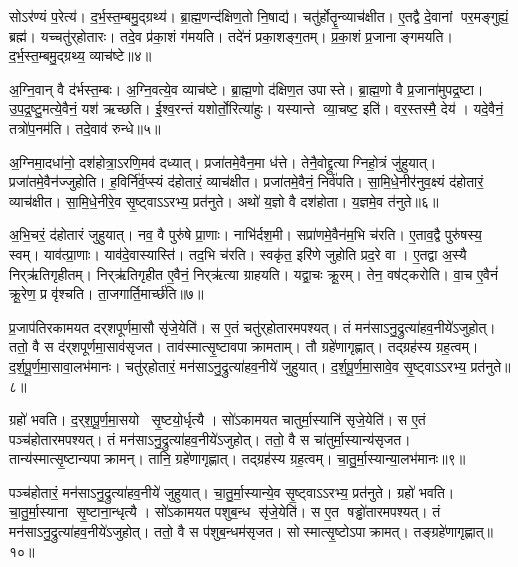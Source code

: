 सोऽर॑ण्यं प॒रेत्य॑।
द॒र्भ॒स्त॒म्बमु॒द्ग्रथ्य॑।
ब्रा॒ह्म॒णन्द॑क्षिण॒तो नि॒षाद्य॑।
चतु॑र्होतॄ॒न्व्याच॑क्षीत।
ए॒तद्वै दे॒वानां पर॒मङ्गुह्यं॒ ब्रह्म॑।
यच्चतु॑र्‌होतारः।
तदे॒व प्र॑का॒शं ग॑मयति।
तदे॑नं प्रका॒शङ्ग॒तम्।
प्र॒का॒शं प्र॒जानाङ्गमयति।
द॒र्भ॒स्त॒म्बमु॒द्ग्रथ्य॒ व्याच॑ष्टे॥४॥

अ॒ग्नि॒वान् वै द॑र्भस्त॒म्बः।
अ॒ग्नि॒वत्ये॒व व्याच॑ष्टे।
ब्रा॒ह्म॒णो द॑क्षिण॒त उपास्ते।
ब्रा॒ह्म॒णो वै प्र॒जाना॑मुपद्र॒ष्टा।
उ॒प॒द्र॒ष्टु॒मत्ये॒वैनं॒ यश॑ ऋच्छति।
ई॒श्व॒रन्तं यशोर्तो॒रित्या॑हुः।
यस्यान्ते व्या॒चष्ट॒ इति॑।
वर॒स्तस्मै॒ देय॑।
यदे॒वैनं॒ तत्रो॑प॒नम॑ति।
तदे॒वाव॑ रुन्धे॥५॥

अ॒ग्निमा॒दधा॑नो॒ दश॑होत्रा॒ऽरणि॒मव॑ दध्यात्।
प्रजा॑तमे॒वैन॒मा ध॑त्ते।
तेनै॒वोद्द्रुत्याग्निहो॒त्रं जु॑हुयात्।
प्रजा॑तमे॒वैन॑ज्जुहोति।
ह॒विर्नि॑र्व॒प्स्यं द॑होतारं॒ व्याच॑क्षीत।
प्रजा॑तमे॒वैनं॒ निर्व॑पति।
सा॒मि॒धे॒नीर॑नुव॒क्ष्यं द॑होतारं॒ व्याच॑क्षीत।
सा॒मि॒धे॒नीरे॒व सृ॒ष्ट्वाऽऽरभ्य॒ प्रत॑नुते।
अथो॑ य॒ज्ञो वै दश॑होता।
य॒ज्ञमे॒व त॑नुते॥६॥

अ॒भि॒चरं॒ द॑होतारं जुहुयात्।
नव॒ वै पुरु॑षे प्रा॒णाः।
नाभि॑र्दश॒मी।
सप्रा॑णमे॒वैन॑म॒भि च॑रति।
ए॒ताव॒द्वै पुरु॑षस्य॒ स्वम्।
याव॑त्प्रा॒णाः।
याव॑दे॒वास्यास्ति॑।
तद॒भि च॑रति।
स्वकृ॑त॒ इरि॑णे जुहोति प्रद॒रे वा।
ए॒तद्वा अ॒स्यै निर्‌ऋ॑तिगृहीतम्।
निर्‌ऋ॑तिगृहीत ए॒वैनं॒ निर्‌ऋ॑त्या ग्राहयति।
यद्वा॒चः क्रू॒रम्।
तेन॒ वष॑ट्करोति।
वा॒च ए॒वैनं॑ क्रू॒रेण॒ प्र वृ॑श्चति।
ता॒जगार्ति॒मार्च्छ॑ति॥७॥\anuvakamend[दश॑होता॒ सृष्ट्या॑ ऋ॒च्छेद्व्याच॑प्टे रुन्ध ए॒व त॑नुते॒ निर्‌ऋ॑तिगृहीतं॒ पञ्च॑ च]

प्र॒जाप॑तिरकामयत दर्‌शपूर्णमा॒सौ सृ॑जे॒येति॑।
स ए॒तं  चतु॑र्‌होतारमपश्यत्।
तं मन॑साऽनु॒द्रुत्या॑हव॒नीये॑ऽजुहोत्।
ततो॒ वै स द॑र्‌शपूर्णमा॒साव॑सृजत।
ताव॑स्मात्सृ॒ष्टावपा\-क्रामताम्।
तौ ग्रहे॑णागृह्णात्।
तद्ग्रह॑स्य ग्रह॒त्वम्।
द॒र्श॒पू॒र्ण॒मा॒सावा॒लभ॑मानः।
चतु॑र्‌होतारं॒ मन॑साऽनु॒द्रुत्या॑\-हव॒नीये॑ जुहुयात्।
द॒र्श॒पू॒र्ण॒मा॒सावे॒व सृ॒ष्ट्वाऽऽरभ्य॒ प्रत॑नुते॥८॥

ग्रहो॑ भवति।
द॒र्‌श॒पू॒र्ण॒मा॒सयो सृ॒ष्टयो॒र्धृत्यै।
सो॑ऽकामयत चातुर्मा॒स्यानि॑ सृजे॒येति॑।
स ए॒तं पञ्च॑होतारमपश्यत्।
तं मन॑साऽनु॒द्रुत्या॑हव॒नीये॑ऽजुहोत्।
ततो॒ वै स चा॑तुर्मा॒स्यान्य॑सृजत।
तान्य॑स्मात्सृ॒ष्टान्यपाक्रामन्।
तानि॒ ग्रहे॑णागृह्णात्।
तद्ग्रह॑स्य ग्रह॒त्वम्।
चा॒तु॒र्मा॒स्यान्या॒लभ॑मानः॥९॥

पञ्च॑होतारं॒ मन॑साऽनु॒द्रुत्या॑हव॒नीये॑ जुहुयात्।
चा॒तु॒र्मा॒स्यान्ये॒व सृ॒ष्ट्वाऽऽरभ्य॒ प्रत॑नुते।
ग्रहो॑ भवति।
चा॒तु॒र्मा॒स्याना सृ॒ष्टाना॒न्धृत्यै।
सो॑ऽकामयत पशुब॒न्ध सृ॑जे॒येति॑।
स ए॒त षड्ढो॑तारमपश्यत्।
तं मन॑साऽनु॒द्रुत्या॑हव॒नीये॑ऽजुहोत्।
ततो॒ वै स प॑शुब॒न्धम॑सृजत।
सोस्मात्सृ॒ष्टोऽपाक्रामत्।
तङ्ग्रहे॑णागृह्णात्॥१०॥

